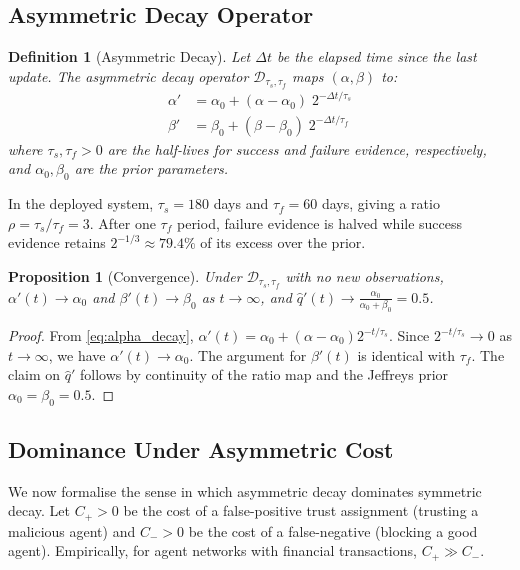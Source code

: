 \documentclass[conference]{IEEEtran}
\newtheorem{proposition}[theorem]{Proposition}
\newtheorem{definition}{Definition}
\begin{document}
\subsection{Asymmetric Decay Operator}

\begin{definition}[Asymmetric Decay]
\label{def:decay}
Let $\Delta t$ be the elapsed time since the last update.
The asymmetric decay operator $\mathcal{D}_{\tau_s,\tau_f}$
maps $(\alpha, \beta)$ to:
\begin{align}
  \alpha' &= \alpha_0 + (\alpha - \alpha_0)\;
    2^{-\Delta t / \tau_s}
    \label{eq:alpha_decay} \\
  \beta'  &= \beta_0  + (\beta  - \beta_0 )\;
    2^{-\Delta t / \tau_f}
    \label{eq:beta_decay}
\end{align}
where $\tau_s, \tau_f > 0$ are the half-lives for success
and failure evidence, respectively, and $\alpha_0, \beta_0$
are the prior parameters.
\end{definition}

In the deployed system, $\tau_s = 180$ days and
$\tau_f = 60$ days, giving a ratio $\rho = \tau_s/\tau_f = 3$.
After one $\tau_f$ period, failure evidence is halved while
success evidence retains $2^{-1/3} \approx 79.4\%$ of its
excess over the prior.

\begin{proposition}[Convergence]
\label{prop:convergence}
Under $\mathcal{D}_{\tau_s,\tau_f}$ with no new observations,
$\alpha'(t) \to \alpha_0$ and $\beta'(t) \to \beta_0$ as
$t \to \infty$, and $\hat{q}'(t) \to \frac{\alpha_0}{\alpha_0
+ \beta_0} = 0.5$.
\end{proposition}
\begin{proof}
From \eqref{eq:alpha_decay}, $\alpha'(t) = \alpha_0 +
(\alpha - \alpha_0) 2^{-t/\tau_s}$. Since $2^{-t/\tau_s} \to 0$
as $t \to \infty$, we have $\alpha'(t) \to \alpha_0$.
The argument for $\beta'(t)$ is identical with $\tau_f$.
The claim on $\hat{q}'$ follows by continuity of the ratio
map and the Jeffreys prior $\alpha_0 = \beta_0 = 0.5$.
\end{proof}

\subsection{Dominance Under Asymmetric Cost}

We now formalise the sense in which asymmetric decay
dominates symmetric decay. Let $C_+ > 0$ be the cost of a
false-positive trust assignment (trusting a malicious agent)
and $C_- > 0$ be the cost of a false-negative (blocking a
good agent). Empirically, for agent networks with financial
transactions, $C_+ \gg C_-$.
\end{document}
